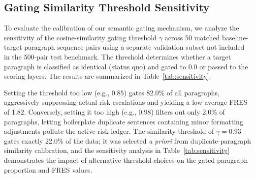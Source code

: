\documentclass[journal]{IEEEtran}
\begin{document}
\begin{table}[h]
\centering
\caption{Inference Latency Profile of Pipeline Components}
\label{tab:latency}
\end{table}

\subsection{Gating Similarity Threshold Sensitivity}
To evaluate the calibration of our semantic gating mechanism, we analyze the sensitivity of the cosine-similarity gating threshold $\gamma$ across 50 matched baseline-target paragraph sequence pairs using a separate validation subset not included in the 500-pair test benchmark. The threshold determines whether a target paragraph is classified as identical (status quo) and gated to 0.0 or passed to the scoring layers. The results are summarized in Table~\ref{tab:sensitivity}.

Setting the threshold too low (e.g., $0.85$) gates 82.0\% of all paragraphs, aggressively suppressing actual risk escalations and yielding a low average FRES of 1.82. Conversely, setting it too high (e.g., $0.98$) filters out only 2.0\% of paragraphs, letting boilerplate duplicate sentences containing minor formatting adjustments pollute the active risk ledger. The similarity threshold of $\gamma=0.93$ gates exactly 22.0\% of the data; it was selected \textit{a priori} from duplicate-paragraph similarity calibration, and the sensitivity analysis in Table~\ref{tab:sensitivity} demonstrates the impact of alternative threshold choices on the gated paragraph proportion and FRES values.
\end{document}
